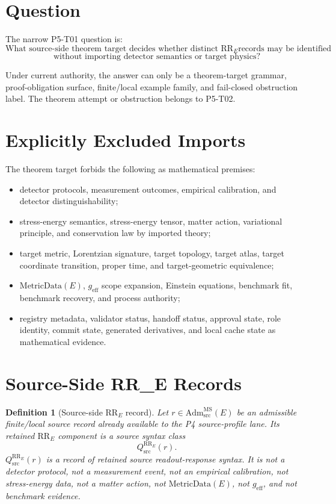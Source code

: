 \documentclass[11pt]{article}
\newcommand{\AdmSrc}{\mathrm{Adm}^{\mathrm{MS}}_{\mathrm{src}}}
\newcommand{\RRE}{\mathrm{RR}_E}
\newcommand{\Qsrc}{Q^{\RRE}_{\mathrm{src}}}
\newcommand{\MetricData}{\mathrm{MetricData}}
\newcommand{\geff}{g_{\mathrm{eff}}}
\newtheorem{definition}{Definition}
\begin{document}
\section{Question}

The narrow P5-T01 question is:
\[
\text{What source-side theorem target decides whether distinct \(\RRE\)
records may be identified}
\]
\[
\text{without importing detector semantics or target physics?}
\]

Under current authority, the answer can only be a theorem-target grammar,
proof-obligation surface, finite/local example family, and fail-closed
obstruction label. The theorem attempt or obstruction belongs to P5-T02.

\section{Explicitly Excluded Imports}

The theorem target forbids the following as mathematical premises:
\begin{itemize}[leftmargin=*]
  \item detector protocols, measurement outcomes, empirical calibration, and
  detector distinguishability;
  \item stress-energy semantics, stress-energy tensor, matter action,
  variational principle, and conservation law by imported theory;
  \item target metric, Lorentzian signature, target topology, target atlas,
  target coordinate transition, proper time, and target-geometric
  equivalence;
  \item \(\MetricData(E)\), \(\geff\) scope expansion, Einstein equations,
  benchmark fit, benchmark recovery, and process authority;
  \item registry metadata, validator status, handoff status, approval state,
  role identity, commit state, generated derivatives, and local cache state as
  mathematical evidence.
\end{itemize}

\section{Source-Side RR\_E Records}

\begin{definition}[Source-side \(\RRE\) record]
Let \(r\in\AdmSrc(E)\) be an admissible finite/local source record already
available to the P4 source-profile lane. Its retained \(\RRE\) component is a
source syntax class
\[
  \Qsrc(r).
\]
\(\Qsrc(r)\) is a record of retained source readout-response syntax. It is not
a detector protocol, not a measurement event, not an empirical calibration,
not stress-energy data, not a matter action, not \(\MetricData(E)\), not
\(\geff\), and not benchmark evidence.
\end{definition}
\end{document}
